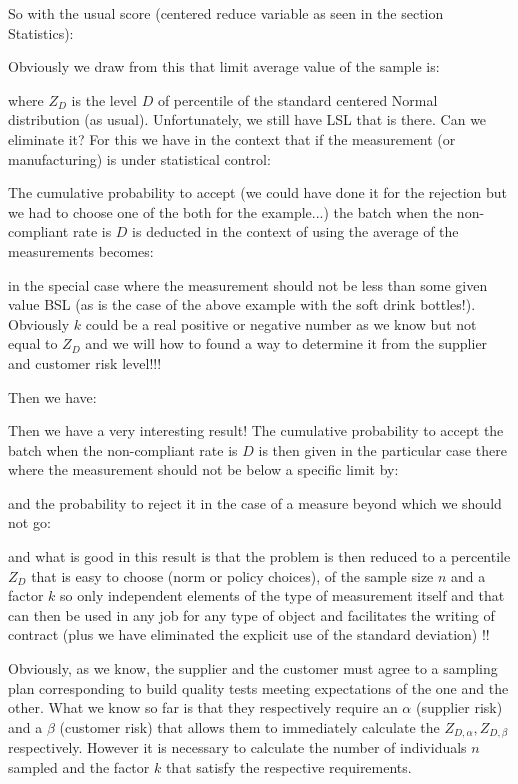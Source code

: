 	So with the usual score (centered reduce variable as seen in the section Statistics):
	
	Obviously we draw from this that limit average value of the sample is:
	
	where $Z_D$ is the level $D$ of percentile of the standard centered Normal distribution (as usual). Unfortunately, we still have LSL that is there. Can we eliminate it? For this we have in the context that if the measurement (or manufacturing) is under statistical control:
	
	The cumulative probability to accept (we could have done it for the rejection but we had to choose one of the both for the example...) the batch when the non-compliant rate is $D$ is deducted in the context of using the average of the measurements becomes:
	
	in the special case where the measurement should not be less than some given value BSL (as is the case of the above example with the soft drink bottles!). Obviously $k$ could be a real positive or negative number as we know but not equal to $Z_D$ and we will how to found a way to determine it from the supplier and customer risk level!!!

	Then we have:
	
	Then we have a very interesting result! The cumulative probability to accept the batch when the non-compliant rate is $D$ is then given in the particular case there where the measurement should not be below a specific limit by:
	
	and the probability to reject it in the case of a measure beyond which we should not go:
	
	and what is good in this result is that the problem is then reduced to a percentile  $Z_D$ that is easy to choose (norm or policy choices), of the sample size $n$ and a factor $k$ so only independent elements of the type of measurement itself and that can then be used in any job for any type of object and facilitates the writing of contract (plus we have eliminated the explicit use of the standard deviation) !!

	Obviously, as we know, the supplier and the customer must agree to a sampling plan corresponding to build quality tests meeting expectations of the one and the other. What we know so far is that they respectively require an $\alpha$ (supplier risk) and a $\beta$ (customer risk) that allows them to immediately calculate the $Z_{D,\alpha},Z_{D,\beta}$ respectively. However it is necessary to calculate the number of individuals $n$ sampled and the factor $k$ that satisfy the respective requirements.


